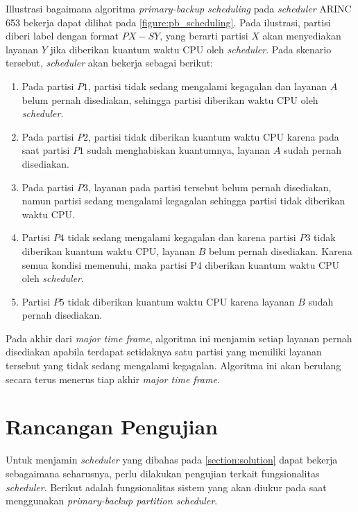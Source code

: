 Illustrasi bagaimana algoritma \textit{primary-backup scheduling} pada \textit{scheduler} ARINC
653 bekerja dapat dilihat pada \autoref{figure:pb_scheduling}. Pada ilustrasi, partisi diberi
label dengan format $PX-SY$, yang berarti partisi $X$ akan menyediakan layanan $Y$ jika
diberikan kuantum waktu CPU oleh \textit{scheduler}. Pada skenario tersebut, \textit{scheduler} akan
bekerja sebagai berikut:

\begin{enumerate}

	\item Pada partisi $P1$, partisi tidak sedang mengalami kegagalan dan
		layanan $A$ belum pernah disediakan, sehingga partisi diberikan waktu
		CPU oleh \textit{scheduler}.

	\item Pada partisi $P2$, partisi tidak diberikan kuantum waktu CPU karena pada saat partisi $P1$
		sudah menghabiskan kuantumnya, layanan $A$ sudah pernah disediakan.

	\item Pada partisi $P3$, layanan pada partisi tersebut belum pernah disediakan,
		namun partisi sedang mengalami kegagalan sehingga partisi tidak diberikan waktu
		CPU.

	\item Partisi $P4$ tidak sedang mengalami kegagalan dan karena partisi $P3$ tidak diberikan
		kuantum waktu CPU, layanan $B$ belum pernah disediakan. Karena semua kondisi
		memenuhi, maka partisi P4 diberikan kuantum waktu CPU oleh \textit{scheduler}.

	\item Partisi $P5$ tidak diberikan kuantum waktu CPU karena layanan $B$ sudah pernah
		disediakan.

\end{enumerate}

Pada akhir dari \textit{major time frame}, algoritma ini menjamin setiap layanan pernah
disediakan apabila terdapat setidaknya satu partisi yang memiliki layanan tersebut yang
tidak sedang mengalami kegagalan. Algoritma ini akan berulang secara terus menerus tiap akhir
\textit{major time frame}.

\section{Rancangan Pengujian}
\label{section:rancangan_pengujian}

Untuk menjamin \textit{scheduler} yang dibahas pada \autoref{section:solution} dapat bekerja
sebagaimana seharusnya, perlu dilakukan pengujian terkait fungsionalitas \textit{scheduler}.
Berikut adalah fungsionalitas sistem yang akan diukur pada saat menggunakan
\textit{primary-backup partition scheduler}.

